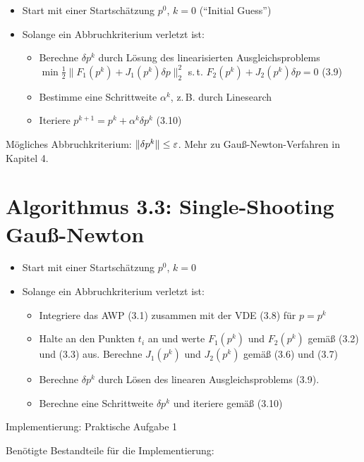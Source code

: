 \begin{itemize}
\item Start mit einer Startschätzung $p^0$, $k=0$ ("`Initial Guess"')
\item Solange ein Abbruchkriterium verletzt ist:
\begin{itemize}
\item Berechne $\delta p^k$ durch Lösung des linearisierten Ausgleichsproblems $\min \tfrac 12 \|F_1(p^k) + J_1(p^k) \delta p\|_2^2$ s.\,t. $F_2(p^k) + J_2(p^k) \delta p = 0$ (3.9)
\item Bestimme eine Schrittweite $\alpha^k$, z.\,B. durch Linesearch 
\item Iteriere $p^{k+1} = p^k + \alpha^k \delta p^k$ (3.10)
\end{itemize} 
\end{itemize}


Mögliches Abbruchkriterium: $\|\delta p^k \| \leq \varepsilon$. Mehr zu Gauß-Newton-Verfahren in Kapitel\,\,4.

\section*{Algorithmus 3.3: Single-Shooting Gauß-Newton}

\begin{itemize}
\item Start mit einer Startschätzung $p^0$, $k=0$
\item Solange ein Abbruchkriterium verletzt ist:
\begin{itemize}
\item Integriere das AWP (3.1) zusammen mit der VDE (3.8) für $p=p^k$
\item Halte an den Punkten $t_i$ an und werte $F_1(p^k)$ und $F_2(p^k)$ gemäß (3.2) und (3.3) aus. Berechne $J_1(p^k)$ und $J_2(p^k)$ gemäß (3.6) und (3.7)
\item Berechne $\delta p^k$ durch Lösen des linearen Ausgleichsproblems (3.9).
\item Berechne eine Schrittweite $\delta p^k$ und iteriere gemäß (3.10)
\end{itemize}
\end{itemize}

Implementierung: Praktische Aufgabe 1

Benötigte Bestandteile für die Implementierung:

